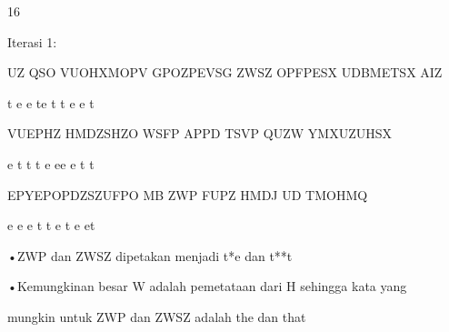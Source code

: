 \documentclass{article}
\begin{document}

16

Iterasi 1:


UZ QSO VUOHXMOPV GPOZPEVSG ZWSZ OPFPESX UDBMETSX AIZ


 t            e   e te     t  t  e e               t 


VUEPHZ HMDZSHZO WSFP APPD TSVP QUZW YMXUZUHSX


   e t    t  t     e  ee     e   t      t



EPYEPOPDZSZUFPO MB ZWP FUPZ HMDJ UD TMOHMQ


  e  e e t t  e     t e   et  

•ZWP dan ZWSZ dipetakan menjadi t*e dan t**t 

•Kemungkinan besar W adalah pemetataan dari H sehingga kata yang 

mungkin untuk ZWP dan ZWSZ adalah the dan that
\end{document}
